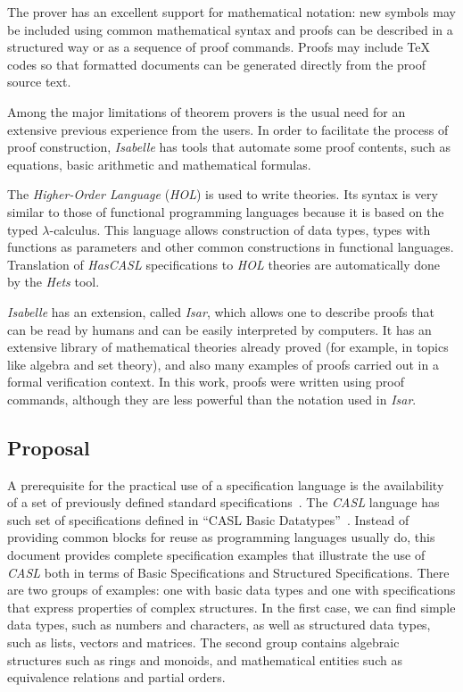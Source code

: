 \documentclass[12pt,twoside]{article}
\numberwithin{spec}{subsection}
\numberwithin{proof}{subsection}
\numberwithin{figure}{subsection}
\numberwithin{code}{subsection}
\begin{document}
The prover has an excellent support for mathematical notation: new symbols may be included using common mathematical syntax and proofs can be described in a structured way or as a sequence of proof commands. Proofs may include \TeX{} codes so that formatted documents can be generated directly from the proof source text.

Among the major limitations of theorem provers is the usual need for an extensive previous experience from the users. In order to facilitate the process of proof construction, \textit{Isabelle} has tools that automate some proof contents, such as equations, basic arithmetic and mathematical formulas.

The \textit{Higher-Order Language} (\textit{HOL}) is used to write theories. Its syntax is very similar to those of functional programming languages because it is based on the typed $\lambda$-calculus. This language allows construction of data types, types with functions as parameters and other common constructions in functional languages. Translation of \textit{HasCASL} specifications to \textit{HOL} theories are automatically done by the \textit{Hets} tool.

\textit{Isabelle} has an extension, called \textit{Isar}, which allows one to describe proofs that can be read by humans and can be easily interpreted by computers. It has an extensive library of mathematical theories already proved (for example, in topics like algebra and set theory), and also many examples of proofs carried out in a formal verification context. In this work, proofs were written using proof commands, although they are less powerful than the notation used in \textit{Isar}.

\subsection{Proposal}
A prerequisite for the practical use of a specification language is the availability of a set of previously defined standard specifications~\citep{Schroder2006}. The \textit{CASL} language has such set of specifications defined in ``CASL Basic Datatypes''~\citep{Roggenbach:2004:CASL-Libraries}. Instead of providing common blocks for reuse as programming languages usually do, this document provides complete specification examples that illustrate the use of \textit{CASL} both in terms of Basic Specifications and Structured Specifications.
There are two groups of examples: one with basic data types and one with specifications that express properties of complex structures. In the first case, we can find simple data types, such as numbers and characters, as well as structured data types, such as lists, vectors and matrices. The second group contains algebraic structures such as rings and monoids, and mathematical entities such as equivalence relations and partial orders.
\end{document}
